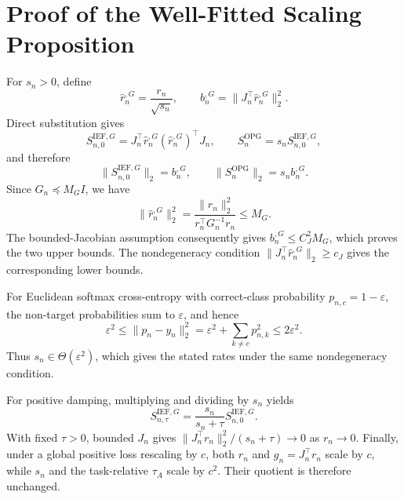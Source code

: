 \section{Proof of the Well-Fitted Scaling Proposition}
\label{app:well-fitted-proof}

For $s_n>0$, define
\[
\hat r_n^{,G}
=
\frac{r_n}{\sqrt{s_n}},
\qquad
b_n^{,G}
=
\|J_n^\top\hat r_n^{,G}\|_2^2.
\]
Direct substitution gives
\[
S_{n,0}^{\mathrm{IEF},G}
=
J_n^\top\hat r_n^{,G}(\hat r_n^{,G})^\top J_n,
\qquad
S_n^{\mathrm{OPG}}
=
s_nS_{n,0}^{\mathrm{IEF},G},
\]
and therefore
\[
\|S_{n,0}^{\mathrm{IEF},G}\|_2=b_n^{,G},
\qquad
\|S_n^{\mathrm{OPG}}\|_2=s_nb_n^{,G}.
\]
Since $G_n\preceq M_GI$, we have
\[
\|\hat r_n^{,G}\|_2^2
=
\frac{\|r_n\|_2^2}{r_n^\top G_n^{-1}r_n}
\le M_G.
\]
The bounded-Jacobian assumption consequently gives
$b_n^{,G}\le C_J^2M_G$, which proves the two upper bounds. The
nondegeneracy condition $\|J_n^\top\hat r_n^{,G}\|_2\ge c_J$ gives
the corresponding lower bounds.

For Euclidean softmax cross-entropy with correct-class probability
$p_{n,c}=1-\varepsilon$, the non-target probabilities sum to
$\varepsilon$, and hence
\[
\varepsilon^2
\le
\|p_n-y_n\|_2^2
=
\varepsilon^2+\sum_{k\ne c}p_{n,k}^2
\le
2\varepsilon^2.
\]
Thus $s_n\in\Theta(\varepsilon^2)$, which gives the stated rates under
the same nondegeneracy condition.

For positive damping, multiplying and dividing by $s_n$ yields
\[
S_{n,\tau}^{\mathrm{IEF},G}
=
\frac{s_n}{s_n+\tau}S_{n,0}^{\mathrm{IEF},G}.
\]
With fixed $\tau>0$, bounded $J_n$ gives
$\|J_n^\top r_n\|_2^2/(s_n+\tau)\to0$ as $r_n\to0$. Finally, under
a global positive loss rescaling by $c$, both $r_n$ and
$g_n=J_n^\top r_n$ scale by $c$, while $s_n$ and the task-relative
$\tau_A$ scale by $c^2$. Their quotient is therefore unchanged.
